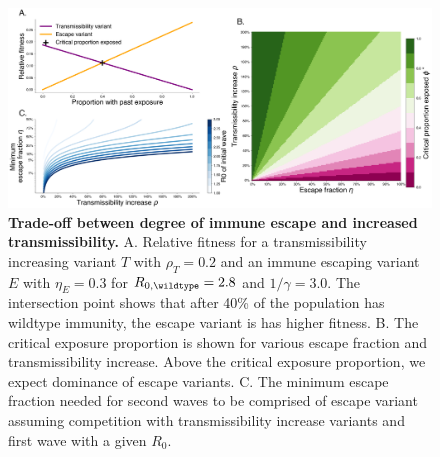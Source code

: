 \documentclass[11pt,oneside,letterpaper]{article}
\newcommand{\varEscape}{\eta}
\newcommand{\varTransmission}{\rho}
\def\tbc#1{\textcolor{purple}{[#1]}}
\begin{document}
\begin{figure}[h]
    \centering
    \includegraphics[width=1.0\linewidth]{./figures/transmission_tradeoff.png}
    \caption{
      \textbf{Trade-off between degree of immune escape and increased transmissibility.}
      A. Relative fitness for a transmissibility increasing variant $T$ with $\varTransmission_T=0.2$ and an immune escaping variant $E$ with $\varEscape_E=0.3$ for $R_{0, \wildtype}=2.8$ and $1 / \gamma = 3.0$.
      The intersection point shows that after 40\% of the population has wildtype immunity, the escape variant is has higher fitness.
      B. The critical exposure proportion is shown for various escape fraction and transmissibility increase. Above the critical exposure proportion, we expect dominance of escape variants.
      C. The minimum escape fraction needed for second waves to be comprised of escape variant assuming competition with transmissibility increase variants and first wave with a given $R_{0}$.
    }
    \label{fig:transmission_tradeoff}
\end{figure}
\end{document}
